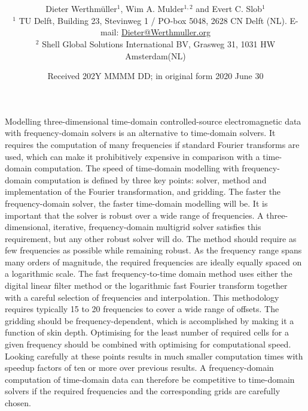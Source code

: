 \documentclass[onecolumn,extra,referee,camera]{gji}
\title[\replaced{Transform for expensive EM kernels}{Time-domain CSEM}]{
  \replaced{Fast Fourier transformation of electromagnetic data for expensive kernels}{Fast time-domain electromagnetic modelling in the frequency domain}}
\author[D. Werthmüller \emph{et al.}]
  {\Large
   Dieter Werthmüller$^1$,     %
   Wim A. Mulder$^{1,2}$ and   %
   Evert C. Slob$^1$           %
   \\
   {\footnotesize
    $^1$ TU Delft, Building 23, Stevinweg 1 / PO-box 5048, 2628 CN Delft (NL).
    E-mail: \href{mailto:Dieter@Werthmuller.org}{Dieter@Werthmuller.org}
   }\\[-.3em]
   {\footnotesize
    $^2$ Shell Global Solutions International BV, Grasweg 31, 1031 HW
    Amsterdam(NL)
   }
  }
\date{Received 202Y MMMM DD; in original form 2020 June 30}
\makeatletter
\let\zz@tabular\@tabular
\let\zzendtabular\endtabular
\let\zz@xtabularcr\@xtabularcr
\let\zz@tabclassz\@tabclassz
\let\zz@tabclassiv \@tabclassiv
\let\zz@tabarray\@tabarray
\makeatother
\begin{document}
\large %

\label{firstpage}

{\makeatletter
\let\@tabular\zz@tabular
\let\endtabular\zzendtabular
\let\@xtabularcr\zz@xtabularcr
\let\@tabclassz\zz@tabclassz
\let\@tabclassiv \zz@tabclassiv 
\let\@tabarray\zz@tabarray
\maketitle
}

\begin{summary}
%
Modelling three-dimensional time-domain controlled-source electromagnetic data
with frequency-domain solvers is an alternative to time-domain solvers. It
requires the computation of many frequencies if standard Fourier transforms are
used, which can make it prohibitively expensive in comparison with a
time-domain computation. The speed of time-domain modelling with
frequency-domain computation is defined by three key points: solver, method and
implementation of the Fourier transformation, and gridding.
%
The faster the frequency-domain solver, the faster time-domain modelling will
be. It is important that the solver is robust over a wide range of frequencies.
A three-dimensional, iterative, frequency-domain multigrid solver satisfies
this requirement, but any other robust solver will do.
%
The method should require as few frequencies as possible while remaining
robust. As the frequency range spans many orders of magnitude, the required
frequencies are ideally equally spaced on a logarithmic scale. The fast
frequency-to-time domain method uses either the digital linear filter method
or the logarithmic fast Fourier transform together with a careful selection of
frequencies and interpolation. This methodology requires typically 15 to 20
frequencies to cover a wide range of offsets.
%
The gridding should be frequency-dependent, which is accomplished by making it
a function of skin depth. Optimising for the least number of required cells for
a given frequency should be combined with optimising for computational speed.
%
Looking carefully at these  points results in much smaller
computation times with speedup factors of ten or more over previous results. A
frequency-domain computation of time-domain data can therefore be competitive
to time-domain solvers if the required frequencies and the corresponding grids
are carefully chosen.
%
\end{summary}
\end{document}
